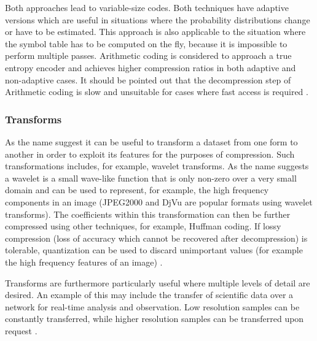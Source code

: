 \documentclass{acm_proc_article-sp}
\begin{document}
Both approaches lead to variable-size codes. Both techniques have adaptive versions which are useful in situations where the probability distributions change or have to be estimated. This 
approach is also applicable to the situation where the symbol table has to be computed on the fly, because it is impossible to perform multiple passes. Arithmetic coding is considered to approach 
a true entropy encoder and achieves higher compression ratios in both adaptive and non-adaptive cases. It should be pointed out that the decompression step of Arithmetic coding is slow and 
unsuitable for cases where fast access is required \cite{ray1995database,williams1999compressing}\cite[ch. 2]{salomon2004data}.

\subsubsection{Transforms}
As the name suggest it can be useful to transform a dataset from one form to another in order to exploit its features for the purposes of compression. Such transformations 
includes, for example, wavelet transforms. As the name suggests a wavelet is a small wave-like function that is only non-zero over a very small domain and can be used 
to represent, for example, the high frequency components in an image (JPEG2000 and DjVu are popular formats using wavelet transforms). The coefficients within this 
transformation can then be further compressed using other techniques, for example, Huffman coding. If lossy compression (loss of accuracy which cannot be recovered after 
decompression)  is tolerable, quantization can be used to discard unimportant values (for example the high frequency features of an image) \cite[ch. 5]{salomon2004data}.

Transforms are furthermore particularly useful where multiple levels of detail are desired. An example of this may include the transfer of scientific data over a network 
for real-time analysis and observation. Low resolution samples can be constantly transferred, while higher resolution samples can be transferred upon request \cite{Tao:1994:PTS:951087.951108}.
\end{document}
